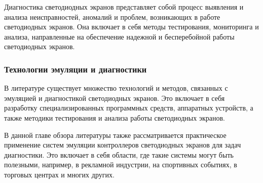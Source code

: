 Диагностика светодиодных экранов представляет собой процесс выявления и анализа неисправностей, аномалий и проблем, возникающих в работе светодиодных экранов. Она включает в себя методы тестирования, мониторинга и анализа, направленные на обеспечение надежной и бесперебойной работы светодиодных экранов.


\subsubsection{Технологии эмуляции и диагностики}

В литературе существует множество технологий и методов, связанных с эмуляцией и диагностикой светодиодных экранов. Это включает в себя разработку специализированных программных средств, аппаратных устройств, а также методики тестирования и анализа работы светодиодных экранов.


В данной главе обзора литературы также рассматривается практическое применение систем эмуляции контроллеров светодиодных экранов для задач диагностики. Это включает в себя области, где такие системы могут быть полезными, например, в рекламной индустрии, на спортивных событиях, в торговых центрах и многих других.